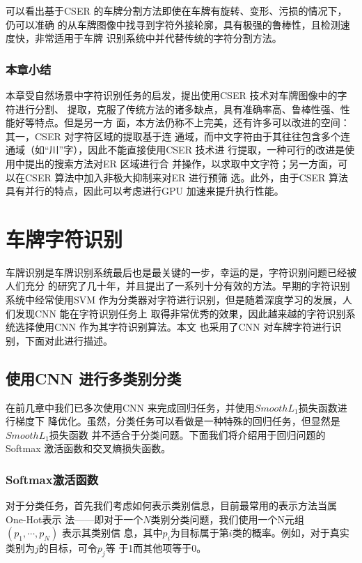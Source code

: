 可以看出基于CSER 的车牌分割方法即使在车牌有旋转、变形、污损的情况下，仍可以准确
的从车牌图像中找寻到字符外接轮廓，具有极强的鲁棒性，且检测速度快，非常适用于车牌
识别系统中并代替传统的字符分割方法。

\subsection{本章小结}

本章受自然场景中字符识别任务的启发，提出使用CSER 技术对车牌图像中的字符进行分割、
提取，克服了传统方法的诸多缺点，具有准确率高、鲁棒性强、性能好等特点。但是另一方
面，本方法仍称不上完美，还有许多可以改进的空间：其一，CSER 对字符区域的提取基于连
通域，而中文字符由于其往往包含多个连通域（如“川”字），因此不能直接使用CSER 技术进
行提取，一种可行的改进是使用\cite{Neumann:2011dy}中提出的搜索方法对ER 区域进行合
并操作，以求取中文字符；另一方面，可以在CSER 算法中加入非极大抑制来对ER 进行预筛
选。此外，由于CSER 算法具有并行的特点，因此可以考虑进行GPU 加速来提升执行性能。

\chapter{车牌字符识别}

车牌识别是车牌识别系统最后也是最关键的一步，幸运的是，字符识别问题已经被人们充分
的研究了几十年，并且提出了一系列十分有效的方法。早期的字符识别系统中经常使用SVM 
作为分类器对字符进行识别，但是随着深度学习的发展，人们发现CNN 能在字符识别任务上
取得非常优秀的效果，因此越来越的字符识别系统选择使用CNN 作为其字符识别算法。本文
也采用了CNN 对车牌字符进行识别，下面对此进行描述。

\section{使用CNN 进行多类别分类}

在前几章中我们已多次使用CNN 来完成回归任务，并使用$Smooth L_1$损失函数进行梯度下
降优化。虽然，分类任务可以看做是一种特殊的回归任务，但显然是$Smooth L_1$损失函数
并不适合于分类问题。下面我们将介绍用于回归问题的Softmax 激活函数和交叉熵损失函数。

\subsection{Softmax激活函数}

对于分类任务，首先我们考虑如何表示类别信息，目前最常用的表示方法当属One-Hot表示
法——即对于一个$N$类别分类问题，我们使用一个N元组 $(p_1, \cdots, p_N)$ 表示其类别信
息，其中$p_i$为目标属于第$i$类的概率。例如，对于真实类别为$j$的目标，可令$p_j$等
于1而其他项等于0。

